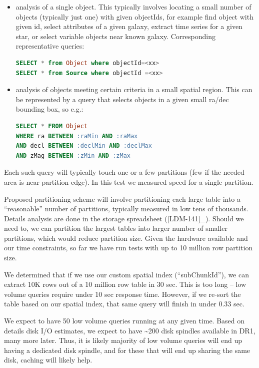 \documentclass[DM,lsstdraft,toc]{lsstdoc}
\begin{document}
\begin{itemize}
\item
  analysis of a single object. This typically involves locating a small
  number of objects (typically just one) with given objectIds, for
  example find object with given id, select attributes of a given
  galaxy, extract time series for a given star, or select variable
  objects near known galaxy. Corresponding representative queries:

\begin{lstlisting}[language=SQL]
SELECT * from Object where objectId=<xx>
SELECT * from Source where objectId =<xx>
\end{lstlisting}
\item
  analysis of objects meeting certain criteria in a small spatial
  region. This can be represented by a query that selects objects in a
  given small ra/dec bounding box, so e.g.:

\begin{lstlisting}[language=SQL]
SELECT * FROM Object
WHERE ra BETWEEN :raMin AND :raMax
AND decl BETWEEN :declMin AND :declMax
AND zMag BETWEEN :zMin AND :zMax
\end{lstlisting}
\end{itemize}

Each such query will typically touch one or a few partitions (few if the
needed area is near partition edge). In this test we measured speed for
a single partition.

Proposed partitioning scheme will involve partitioning each large table
into a ``reasonable'' number of partitions, typically measured in low
tens of thousands. Details analysis are done in the storage spreadsheet
({[}LDM-141{]}\_). Should we need to, we can partition the largest
tables into larger number of smaller partitions, which would reduce
partition size. Given the hardware available and our time constraints,
so far we have run tests with up to 10 million row partition size.

We determined that if we use our custom spatial index (``subChunkId''),
we can extract 10K rows out of a 10 million row table in 30 sec. This is
too long -- low volume queries require under 10 sec response time.
However, if we re-sort the table based on our spatial index, that same
query will finish in under 0.33 sec.

We expect to have 50 low volume queries running at any given time. Based
on details disk I/O estimates, we expect to have \textasciitilde{}200
disk spindles available in DR1, many more later. Thus, it is likely
majority of low volume queries will end up having a dedicated disk
spindle, and for these that will end up sharing the same disk, caching
will likely help.
\end{document}
